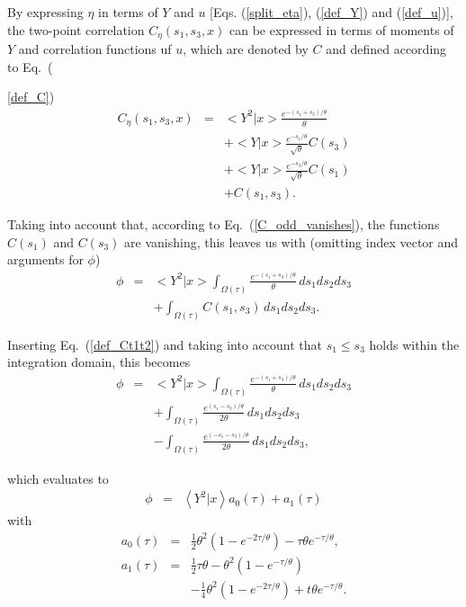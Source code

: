 \documentclass[aps,twocolumn,superscriptaddress,showpacs,showkeys]{revtex4}
\newcommand{\e}[1]{{ e^{#1/\theta} }}
\begin{document}
By expressing $\eta$ in terms of $Y$ and $u$ [Eqs. (\ref{split_eta}), (\ref{def_Y}) and (\ref{def_u})], the two-point
correlation $C_\eta(s_1,s_3,x)$ can be expressed in terms of moments of $Y$ and correlation functions uf $u$, which are
denoted by $C$ and defined according to Eq.~({\ref{def_C})
%
\begin{eqnarray}
C_\eta(s_1,s_3,x) \!&=&
\big<Y^2|x\big>\frac{e^{-(s_1+s_3)/\theta}}{\theta}\nonumber\\
   \!&&+\big<Y|x\big>\frac{e^{-s_1/\theta}}{\sqrt{\theta}}C(s_3)\nonumber\\
   \!&&+\big<Y|x\big>\frac{e^{-s_3/\theta}}{\sqrt{\theta}}C(s_1)\nonumber\\
   \!&&+C(s_1,s_3).
\end{eqnarray}

\noindent Taking into account that, according to Eq.~(\ref{C_odd_vanishes}), the functions $C(s_1)$ and $C(s_3)$ are vanishing,
this leaves us with (omitting index vector and arguments for $\phi$)
%
\begin{eqnarray}
\phi
  &=& \big<Y^2|x\big> \int_{\Omega(\tau)}\!\!\! \frac{e^{-(s_1+s_3)/\theta}}{\theta} \,ds_1 ds_2 ds_3 \nonumber\\
  &&  +\int_{\Omega(\tau)}\!\!\! C(s_1,s_3) \,ds_1 ds_2 ds_3.
\end{eqnarray}

\noindent Inserting Eq.~(\ref{def_Ct1t2}) and taking into account that $s_1\le s_3$ holds within the integration domain, this
becomes
%
\begin{eqnarray}
\phi
  &=& \big<Y^2|x\big> \int_{\Omega(\tau)}\!\!\! \frac{e^{-(s_1+s_3)/\theta}}{\theta} \,ds_1 ds_2 ds_3 \nonumber\\
  &&  +\int_{\Omega(\tau)}\!\!\! \frac{\e{(s_1-s_3)}}{2\theta} \,ds_1 ds_2 ds_3 \nonumber\\
  &&  -\int_{\Omega(\tau)}\!\!\! \frac{\e{(-s_1-s_3)}}{2\theta} \,ds_1 ds_2 ds_3,
\end{eqnarray}

\noindent which evaluates to
%
\begin{eqnarray}
\phi
  &=& \left<Y^2|x\right> a_0(\tau) + a_1(\tau)
\end{eqnarray}
\noindent with
%
\begin{subequations}
\begin{eqnarray}
a_0(\tau) &=& \frac{1}{2}\theta^2 (1-\e{-2\tau}) -\tau\theta \e{-\tau},\\
a_1(\tau) &=& \frac{1}{2}\tau\theta  -\theta^2 (1-\e{-\tau})\nonumber\\
          && -\frac{1}{4}\theta^2 (1-\e{-2\tau}) +t\theta \e{-\tau}.
\end{eqnarray}
\end{subequations}

}
\end{document}
